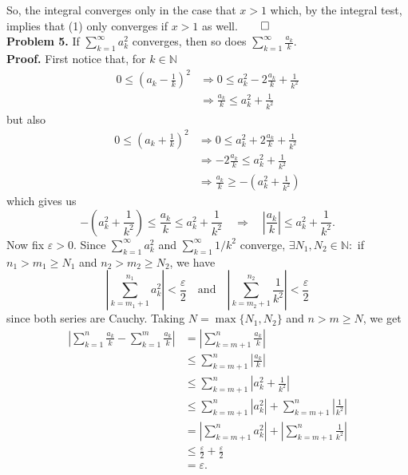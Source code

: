 \documentclass[11pt, letterpaper]{article}
\newcommand{\mbb}[1]{\mathbb{#1}}
\begin{document}
    So, the integral converges only in the case that $x>1$ which, by the integral test, implies that (1) only converges if $x>1$ as well.\hfill{$\qed$}\\[10pt]
    {\bf Problem 5.} If $\sum_{k=1}^\infty a_k^2$ converges, then so does $\sum_{k=1}^\infty\frac{a_k}{k}.$\\[10pt]
    {\bf Proof.} First notice that, for $k\in\mbb{N}$
    \begin{align*}
        0\leq \left(a_k-\frac{1}{k}\right)^2&\Rightarrow0\leq a_k^2-2\frac{a_k}{k}+\frac{1}{k^2}\\
        &\Rightarrow\frac{a_k}{k}\leq a_k^2+\frac{1}{k^2}
    \end{align*}
    but also
    \begin{align*}
        0\leq \left(a_k+\frac{1}{k}\right)^2&\Rightarrow 0\leq a_k^2+2\frac{a_k}{k}+\frac{1}{k^2}\\
        &\Rightarrow -2\frac{a_k}{k}\leq a^2_k+\frac{1}{k^2}\\
        &\Rightarrow \frac{a_k}{k}\geq -\left(a_k^2+\frac{1}{k^2}\right)
    \end{align*}
    which gives us
    \[-\left(a_k^2+\frac{1}{k^2}\right)\leq \frac{a_k}{k}\leq a_k^2+\frac{1}{k^2}\quad\Rightarrow\quad \left|\frac{a_k}{k}\right|\leq a_k^2+\frac{1}{k^2}.\tag{3}\]
    Now fix $\varepsilon>0$. Since $\sum_{k=1}^\infty a_k^2$ and $\sum_{k=1}^\infty 1/k^2$ converge, $\exists N_1,N_2\in\mbb{N}:$ if $n_1>m_1\geq N_1$ and $n_2>m_2\geq N_2$, we have
    \[\left|\sum_{k=m_1+1}^{n_1} a_k^2\right|<\frac{\varepsilon}{2}\quad\text{and}\quad\left|\sum_{k=m_2+1}^{n_2}\frac{1}{k^2}\right|<\frac{\varepsilon}{2}\]
    since both series are Cauchy. Taking $N=\max\{N_1,N_2\}$ and $n>m\geq N$, we get
    \begin{align*}
        \left|\sum_{k=1}^n\frac{a_k}{k}-\sum_{k=1}^m\frac{a_k}{k}\right|&=\left|\sum_{k=m+1}^n\frac{a_k}{k}\right|\\
        &\leq\sum_{k=m+1}^n\left|\frac{a_k}{k}\right|\tag{triangle inequality}\\
        &\leq \sum_{k=m+1}^n\left|a_k^2+\frac{1}{k^2}\right|\tag{by (3)}\\
        &\leq \sum_{k=m+1}^n\left|a_k^2\right|+\sum_{k=m+1}^n\left|\frac{1}{k^2}\right|\tag{triangle inequality}\\
        &= \left|\sum_{k=m+1}^na_k^2\right|+\left|\sum_{k=m+1}^n\frac{1}{k^2}\right|\tag{since $a_k^2$, $1/k^2\geq 0$ $\forall k$}\\
        &\leq\frac{\varepsilon}{2}+\frac{\varepsilon}{2}\\
        &=\varepsilon.
    \end{align*}
\end{document}
